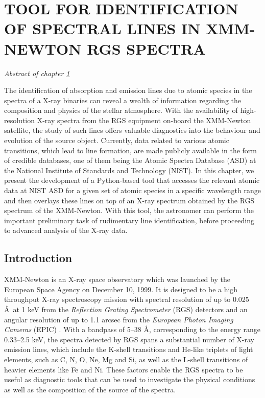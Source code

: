 \chapter{TOOL FOR IDENTIFICATION OF SPECTRAL LINES IN XMM-NEWTON RGS SPECTRA} \label{chap:tool}
    \minitoc
    \begin{center}
    	\emph{Abstract of chapter \ref{chap:tool}}
    \end{center}
    The identification of absorption and emission lines due to atomic species in the spectra of a X-ray binaries can reveal a wealth of information regarding the composition and physics of the stellar atmosphere. With the availability of high-resolution X-ray spectra from the RGS equipment on-board the XMM-Newton satellite, the study of such lines offers valuable diagnostics into the behaviour and evolution of the source object. Currently, data related to various atomic transitions, which lead to line formation, are made publicly available in the form of credible databases, one of them being the Atomic Spectra Database (ASD) at the National Institute of Standards and Technology (NIST). In this chapter, we present the development of a Python-based tool that accesses the relevant atomic data at NIST ASD for a given set of atomic species in a specific wavelength range and then overlays these lines on top of an X-ray spectrum obtained by the RGS spectrum of the XMM-Newton. With this tool, the astronomer can perform the important preliminary task of rudimentary line identification, before proceeding to advanced analysis of the X-ray data.
    
    \section{Introduction} \label{tool:intro}
    	XMM-Newton is an X-ray space observatory which was launched by the European Space Agency on December 10, 1999. It is designed to be a high throughput X-ray spectroscopy mission with spectral resolution of up to 0.025 \AA\ at 1 keV from the \textit{Reflection Grating Spectrometer} (RGS) detectors and an angular resolution of up to 1.1 arcsec from the \textit{European Photon Imaging Cameras} (EPIC) \cite{ehle2003xmm,jansen2001xmm}. With a bandpass of 5--38 \AA, corresponding to the energy range 0.33--2.5 keV, the spectra detected by RGS spans a substantial number of X-ray emission lines, which include the K-shell transitions and He-like triplets of light elements, such as C, N, O, Ne, Mg and Si, as well as the L-shell transitions of heavier elements like Fe and Ni. These factors enable the RGS spectra to be useful as diagnostic tools that can be used to investigate the physical conditions as well as the composition of the source of the spectra.
    
